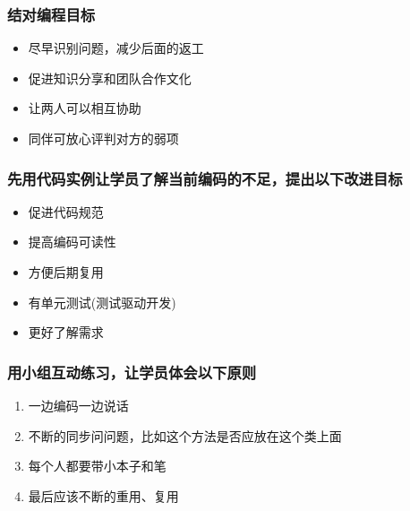 \hypertarget{ux7ed3ux5bf9ux7f16ux7a0bux76eeux6807}{%
\subsubsection{结对编程目标}\label{ux7ed3ux5bf9ux7f16ux7a0bux76eeux6807}}

\begin{itemize}
\tightlist
\item
  尽早识别问题，减少后面的返工
\item
  促进知识分享和团队合作文化
\item
  让两人可以相互协助
\item
  同伴可放心评判对方的弱项\\
\end{itemize}

\hypertarget{ux5148ux7528ux4ee3ux7801ux5b9eux4f8bux8ba9ux5b66ux5458ux4e86ux89e3ux5f53ux524dux7f16ux7801ux7684ux4e0dux8db3ux63d0ux51faux4ee5ux4e0bux6539ux8fdbux76eeux6807}{%
\subsubsection{先用代码实例让学员了解当前编码的不足，提出以下改进目标}\label{ux5148ux7528ux4ee3ux7801ux5b9eux4f8bux8ba9ux5b66ux5458ux4e86ux89e3ux5f53ux524dux7f16ux7801ux7684ux4e0dux8db3ux63d0ux51faux4ee5ux4e0bux6539ux8fdbux76eeux6807}}

\begin{itemize}
\tightlist
\item
  促进代码规范
\item
  提高编码可读性
\item
  方便后期复用
\item
  有单元测试(测试驱动开发)
\item
  更好了解需求
\end{itemize}

\hypertarget{ux7528ux5c0fux7ec4ux4e92ux52a8ux7ec3ux4e60ux8ba9ux5b66ux5458ux4f53ux4f1aux4ee5ux4e0bux539fux5219}{%
\subsubsection{用小组互动练习，让学员体会以下原则}\label{ux7528ux5c0fux7ec4ux4e92ux52a8ux7ec3ux4e60ux8ba9ux5b66ux5458ux4f53ux4f1aux4ee5ux4e0bux539fux5219}}

\begin{enumerate}
\tightlist
\item
  一边编码一边说话\\
\item
  不断的同步问问题，比如这个方法是否应放在这个类上面\\
\item
  每个人都要带小本子和笔\\
\item
  最后应该不断的重用、复用\\
\end{enumerate}

